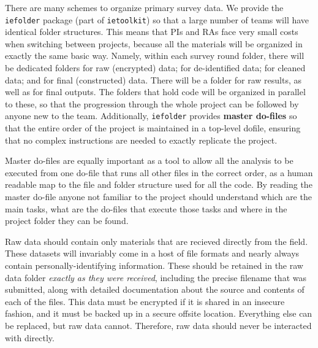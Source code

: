 There are many schemes to organize primary survey data.
We provide the \texttt{iefolder}
package (part of \texttt{ietoolkit}) so that
a large number of teams will have identical folder structures.
This means that PIs and RAs face very small costs
when switching between projects, because all the materials
will be organized in exactly the same basic way.
Namely, within each survey round folder,
there will be dedicated folders for raw (encrypted) data;
for de-identified data; for cleaned data; and for final (constructed) data.
There will be a folder for raw results, as well as for final outputs.
The folders that hold code will be organized in parallel to these,
so that the progression through the whole project can be followed
by anyone new to the team. Additionally, \texttt{iefolder}
provides \textbf{master do-files} so that the entire order
of the project is maintained in a top-level dofile,
ensuring that no complex instructions are needed
to exactly replicate the project.

Master do-files are equally important as a tool to allow all the analysis to
be executed from one do-file that runs all other files in the correct order,
as a human readable map to the file and folder structure used for all the
code. By reading the master do-file anyone not familiar to the project should
understand which are the main tasks, what are the do-files that execute those
tasks and where in the project folder they can be found.

Raw data should contain only materials that are recieved directly from the field.
These datasets will invariably come in a host of file formats
and nearly always contain personally-identifying information.
These should be retained in the raw data folder
\textit{exactly as they were received},
including the precise filename that was submitted,
along with detailed documentation about the source and contents
of each of the files. This data must be encrypted
if it is shared in an insecure fashion,
and it must be backed up in a secure offsite location.
Everything else can be replaced, but raw data cannot.
Therefore, raw data should never be interacted with directly.

